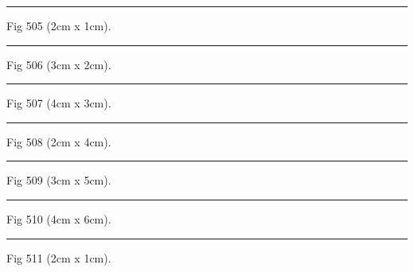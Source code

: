 \documentclass[a4paper,11pt]{article}
\begin{document}
\begin{swarmwrap}%
  \begin{minipage}[t]{2cm}
    \centering
    \rule{\linewidth}{1cm}
    {\footnotesize Fig 505 (2cm x 1cm).}
  \end{minipage}%
\end{swarmwrap}%
\swarmwrapnext
\lipsum[55]%

\begin{swarmwrap}%
  \begin{minipage}[t]{3cm}
    \centering
    \rule{\linewidth}{2cm}
    {\footnotesize Fig 506 (3cm x 2cm).}
  \end{minipage}%
\end{swarmwrap}%
\swarmwrapnext
\lipsum[56]%

\begin{swarmwrap}%
  \begin{minipage}[t]{4cm}
    \centering
    \rule{\linewidth}{3cm}
    {\footnotesize Fig 507 (4cm x 3cm).}
  \end{minipage}%
\end{swarmwrap}%
\swarmwrapnext
\lipsum[57]%

\begin{swarmwrap}%
  \begin{minipage}[t]{2cm}
    \centering
    \rule{\linewidth}{4cm}
    {\footnotesize Fig 508 (2cm x 4cm).}
  \end{minipage}%
\end{swarmwrap}%
\swarmwrapnext
\lipsum[58]%

\begin{swarmwrap}%
  \begin{minipage}[t]{3cm}
    \centering
    \rule{\linewidth}{5cm}
    {\footnotesize Fig 509 (3cm x 5cm).}
  \end{minipage}%
\end{swarmwrap}%
\swarmwrapnext
\lipsum[59]%

\begin{swarmwrap}%
  \begin{minipage}[t]{4cm}
    \centering
    \rule{\linewidth}{6cm}
    {\footnotesize Fig 510 (4cm x 6cm).}
  \end{minipage}%
\end{swarmwrap}%
\swarmwrapnext
\lipsum[60]%

\begin{swarmwrap}%
  \begin{minipage}[t]{2cm}
    \centering
    \rule{\linewidth}{1cm}
    {\footnotesize Fig 511 (2cm x 1cm).}
  \end{minipage}%
\end{swarmwrap}%
\swarmwrapnext
\lipsum[61]%
\end{document}
